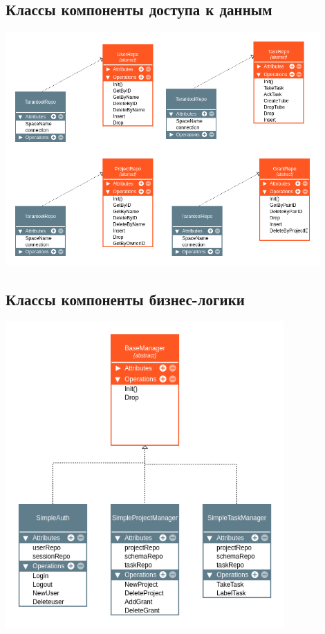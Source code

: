 \subsection{Классы компоненты доступа к данным}
\begin{frame}
    \includegraphics[width=0.9\textwidth]{./dataaccess.png}
\end{frame}

\subsection{Классы компоненты бизнес-логики}

\begin{frame}
    \includegraphics[width=0.8\textwidth]{./business.png}
\end{frame}

